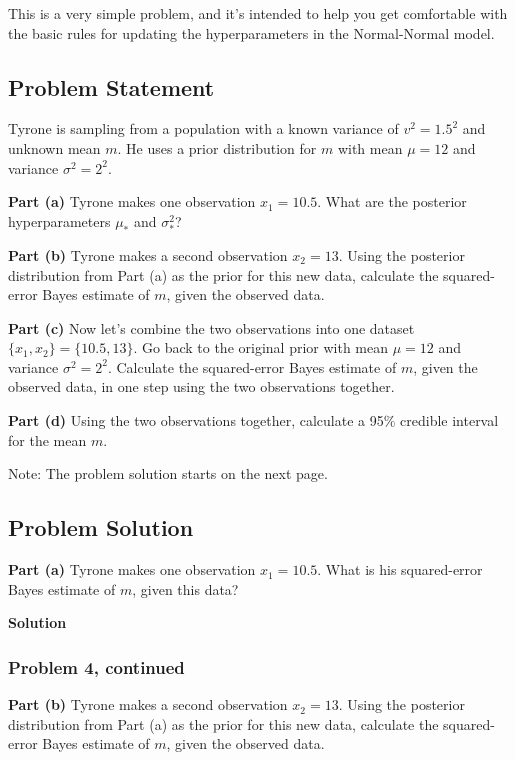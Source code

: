 \documentclass[12pt]{article}
\theoremstyle{definition}
\begin{document}
This is a very simple problem, and it's intended to help you get comfortable with the basic rules for updating the hyperparameters in the Normal-Normal model.


\subsection*{Problem Statement}

Tyrone is sampling from a population with a known variance of $v^2 = 1.5^2$ and unknown mean $m$. He uses a prior distribution for $m$ with mean $\mu = 12$ and variance $\sigma^2 = 2^2$.

\bigskip
\noindent
{\bf Part (a)} Tyrone makes one observation $x_1 = 10.5$. What are the posterior hyperparameters $\mu_*$ and $\sigma_*^2$?

\bigskip
\noindent
{\bf Part (b)} Tyrone makes a second observation $x_2 = 13$. Using the posterior distribution from Part (a) as the prior for this new data, calculate the squared-error Bayes estimate of $m$, given the observed data.

\bigskip
\noindent
{\bf Part (c)} Now let's combine the two observations into one dataset $\{x_1, x_2\} = \{10.5, 13\}$. Go back to the original prior with mean $\mu = 12$ and variance $\sigma^2 = 2^2$. Calculate the squared-error Bayes estimate of $m$, given the observed data, in one step using the two observations together.

\bigskip
\noindent
{\bf Part (d)} Using the two observations together, calculate a 95\% credible interval for the mean $m$.

\bigskip
\noindent
Note: The problem solution starts on the next page.

\newpage
\subsection*{Problem Solution}

\noindent
{\bf Part (a)} Tyrone makes one observation $x_1 = 10.5$. What is his squared-error Bayes estimate of $m$, given this data?

\bigskip
\noindent
{\bf Solution} 



\newpage
\subsubsection*{Problem 4, continued}

\noindent
{\bf Part (b)} Tyrone makes a second observation $x_2 = 13$. Using the posterior distribution from Part (a) as the prior for this new data, calculate the squared-error Bayes estimate of $m$, given the observed data.
\end{document}
